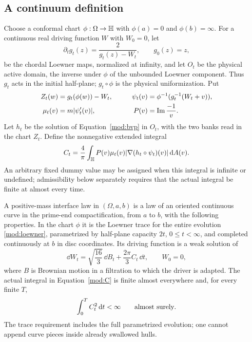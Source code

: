 \subsection{A continuum definition}
Choose a conformal chart $\phi:\Omega\to\mathbb H$ with
$\phi(a)=0$ and $\phi(b)=\infty$. For a continuous real driving
function $W$ with $W_0=0$, let
\begin{equation}\label{mod:loewner}
 \partial_tg_t(z)=\frac{2}{g_t(z)-W_t},\qquad g_0(z)=z,
\end{equation}
be the chordal Loewner maps, normalized at infinity, and let $O_t$
be the physical active domain, the inverse under $\phi$ of the
unbounded Loewner component. Thus $g_t$ acts in the initial
half-plane; $g_t\circ\phi$ is the physical uniformization.
Put
\begin{equation}\label{mod:chart}
 \begin{aligned}
 Z_t(w)&=g_t(\phi(w))-W_t,&\qquad
 \psi_t(v)&=\phi^{-1}(g_t^{-1}(W_t+v)),\\
 \mu_t(v)&=m|\psi_t'(v)|,&
 P(v)&=\operatorname{Im}\frac{-1}{v}.
 \end{aligned}
\end{equation}
Let $h_t$ be the solution of Equation~\eqref{mod:bvp} in $O_t$,
with the two banks read in the chart $Z_t$. Define the nonnegative
extended integral
\begin{equation}\label{mod:C}
 C_t=\frac4\pi\int_{\mathbb H}P(v)\mu_t(v)
             |\nabla(h_t\circ\psi_t)(v)|\,\mathrm d A(v).
\end{equation}
An arbitrary fixed dummy value may be assigned when this integral
is infinite or undefined; admissibility below separately requires
that the actual integral be finite at almost every time.

\begin{definition}\label{def:law}
A positive-mass interface law in $(\Omega,a,b)$ is a law of an
oriented continuous curve in the prime-end compactification, from
$a$ to $b$, with the following properties. In the chart $\phi$ it
is the Loewner trace for the entire evolution
\eqref{mod:loewner}, parametrized by half-plane capacity $2t$,
$0\le t<\infty$, and completed continuously at $b$ in disc
coordinates. Its driving function is a weak solution of
\begin{equation}\label{mod:SDE}
 \dd W_t=\sqrt{\frac{16}{3}}\,\dd B_t
                  +\frac{2\pi}{3}C_t\,\dd t,
 \qquad W_0=0,
\end{equation}
where $B$ is Brownian motion in a filtration to which the driver is
adapted. The actual integral in Equation~\eqref{mod:C} is finite
almost everywhere and, for every finite $T$,
\begin{equation}\label{mod:finite-energy}
 \int_0^T C_t^2\,\mathrm d t<\infty\qquad\hbox{almost surely}.
\end{equation}
The trace requirement includes the full parametrized evolution;
one cannot append curve pieces inside already swallowed hulls.
\end{definition}


